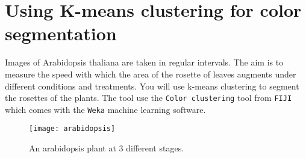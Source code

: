 \section{Using K-means clustering for color segmentation}

Images of Arabidopsis thaliana are taken in regular intervals. The aim is to measure the speed with which the area of the rosette of leaves augments under different conditions and treatments. You will use k-means clustering to segment the rosettes of the plants. The tool use the {\tt Color clustering} tool from {\tt FIJI} which comes with the {\tt Weka} machine learning software.   

\begin{figure}[!htb]
 \centering
 \texttt{[image: arabidopsis]}
 \caption{An arabidopsis plant at 3 different stages.}
 \label{figure:arabidopsis}
\end{figure}

